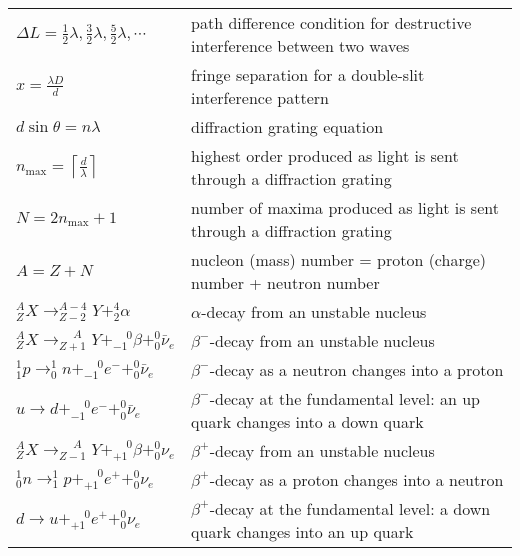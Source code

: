 {{\begin{longtable}{p{} p{}}
$\Delta L = \frac{1}{2}\lambda, \frac{3}{2}\lambda, \frac{5}{2}\lambda, \cdots$ & path difference condition for destructive interference between two waves \\

$x = \frac{\lambda D}{d}$ & fringe separation for a double-slit interference pattern \\

$d\sin\theta = n\lambda$ & diffraction grating equation \\

$n_\text{max} = \left\lceil \frac{d}{\lambda} \right\rceil$ & highest order produced as light is sent through a diffraction grating\\

$N = 2n_\text{max} + 1$ & number of maxima produced as light is sent through a diffraction grating\\

$A=Z+N$ & nucleon (mass) number = proton (charge) number + neutron number \\

$^A_Z X \longrightarrow ^{A-4}_{Z-2} Y + ^4_2 \alpha$ & $\alpha$-decay from an unstable nucleus \\

$^A_Z X \longrightarrow ^{\phantom{+1}A}_{Z+1} Y + ^{\phantom{-}0}_{-1} \beta + ^0_0 \bar{\nu}_e$ & $\beta^-$-decay from an unstable nucleus \\

$^1_1 p \longrightarrow ^1_0 n + ^{\phantom{-}0}_{-1} e^- + ^0_0 \bar{\nu}_e$ & $\beta^-$-decay as a neutron changes into a proton\\

$u \longrightarrow d + ^{\phantom{-}0}_{-1} e^- + ^0_0 \bar{\nu}_e$ & $\beta^-$-decay at the fundamental level: an up quark changes into a down quark\\

$^A_Z X \longrightarrow ^{\phantom{+1}A}_{Z-1} Y + ^{\phantom{+}0}_{+1} \beta + ^0_0 \nu_e$ & $\beta^+$-decay from an unstable nucleus \\

$^1_0 n \longrightarrow ^1_1 p + ^{\phantom{+}0}_{+1} e^+ + ^0_0 \nu_e$ & $\beta^+$-decay as a proton changes into a neutron\\

$d \longrightarrow u + ^{\phantom{-}0}_{+1} e^+ + ^0_0 \nu_e$ & $\beta^+$-decay at the fundamental level: a down quark changes into an up quark\\


\end{longtable} 

}\par}
